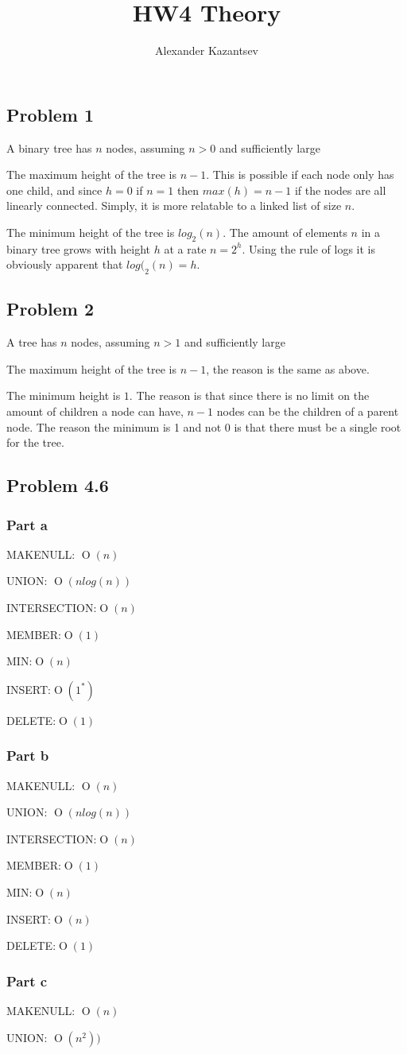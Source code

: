 \documentclass[10pt,letterpaper,oneside]{article}
\title{HW4 Theory}
\author{Alexander Kazantsev}
\newcommand{\Problem}[1]{\subsection*{Problem #1}}
\newcommand{\Part}[1]{\subsubsection*{Part #1}}
\DeclareMathOperator{\Omicron}{O}
\newcommand{\BigOh}[1]{\Omicron(#1)}
\begin{document}
\maketitle

\Problem{1}

A binary tree has $n$ nodes, assuming $n>0$ and sufficiently large

The maximum height of the tree is $n-1$. This is possible if each node only has one child, and since $h=0$ if $n=1$ then $max(h) = n-1$ if the nodes are all linearly connected. Simply, it is more relatable to a linked list of size $n$.

The minimum height of the tree is $log_2(n)$. The amount of elements $n$ in a binary tree grows with height $h$ at a rate $n=2^h$. Using the rule of logs it is obviously apparent that $log(_2(n)=h$. 

\Problem{2}

A tree has $n$ nodes, assuming $n>1$ and sufficiently large

The maximum height of the tree is $n-1$, the reason is the same as above.

The minimum height is $1$. The reason is that since there is no limit on the amount of children a node can have, $n-1$ nodes can be the children of a parent node. The reason the minimum is 1 and not 0 is that there must be a single root for the tree.


\Problem{4.6}

\Part{a}

MAKENULL: $\BigOh{n}$

UNION: $\BigOh{nlog(n)}$

INTERSECTION:$\BigOh{n}$

MEMBER:$\BigOh{1}$

MIN:$\BigOh{n}$

INSERT:$\BigOh{1^*}$

DELETE:$\BigOh{1}$

\Part{b}

MAKENULL: $\BigOh{n}$

UNION: $\BigOh{nlog(n)}$

INTERSECTION:$\BigOh{n}$

MEMBER:$\BigOh{1}$

MIN:$\BigOh{n}$

INSERT:$\BigOh{n}$

DELETE:$\BigOh{1}$
\Part{c}

MAKENULL: $\BigOh{n}$

UNION: $\BigOh{n^2)}$
\end{document}
